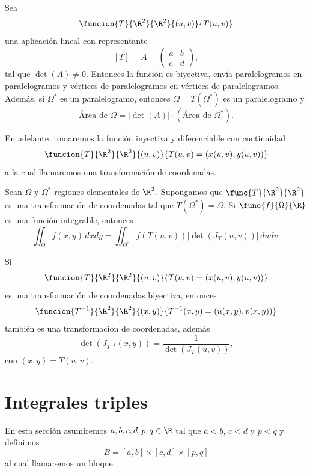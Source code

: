 \documentclass[a4,11pt]{aleph-notas}
\begin{document}
\begin{advertencia}
    Sea
    \[
        \funcion{T}{\R^2}{\R^2}{(u,v)}
            {T(u,v)}
    \]
    una aplicación lineal con representante 
    \[
        [T]= A =\begin{pmatrix}
            a & b \\
            c & d
          \end{pmatrix},
    \]
    tal que $\det(A)\neq 0$. Entonces la función es biyectiva, envía paralelogramos en paralelogramos y vértices de paralelogramos en vértices de paralelogramos. Además, si $\Omega^*$ es un paralelogramo, entonces $\Omega=T(\Omega^*)$ es un paralelogramo y
    \[
        \text{Área de } \Omega = |\det(A)| \cdot (\text{Área de } \Omega^*).
    \]
\end{advertencia}

   
En adelante, tomaremos la función inyectiva y diferenciable con continuidad
\[
    \funcion{T}{\R^2}{\R^2}{(u,v)}{T(u,v)=(x(u,v),y(u,v))}
\]
a la cual llamaremos una transformación de coordenadas.
   
\begin{prop}
    Sean $\Omega$ y $\Omega^*$ regiones elementales de $\R^2$. Supongamos que $\func{T}{\R^2}{\R^2}$ es una transformación de coordenadas tal que $T(\Omega^*)=\Omega$. Si $\func{f}{\Omega}{\R}$ es una función integrable, entonces
    \[
        \iint_\Omega f(x,y)\, dxdy = \iint_{\Omega^*} f(T(u,v)) |\det(J_T(u,v))| \, dudv.
    \]
\end{prop}
   
\begin{advertencia}
    Si 
    \[
        \funcion{T}{\R^2}{\R^2}{(u,v)}{T(u,v)=(x(u,v),y(u,v))}
    \]
    es una transformación de coordenadas biyectiva, entonces
    \[
        \funcion{T^{-1}}{\R^2}{\R^2}{(x,y)}{T^{-1}(x,y)=(u(x,y),v(x,y))}
    \]
    también es una transformación de coordenadas, además
    \[
        \det(J_{T^{-1}}(x,y)) = \frac{1}{\det(J_{T}(u,v))},
    \]
    con $(x,y)=T(u,v)$.
\end{advertencia}


\section{Integrales triples}


En esta sección asumiremos $a,b,c,d,p,q\in\R$ tal que $a<b$, $c<d$ y $p<q$ y definimos
\[
    B=[a,b]\times [c,d] \times [p,q]
\]
al cual llamaremos un bloque.
\end{document}
